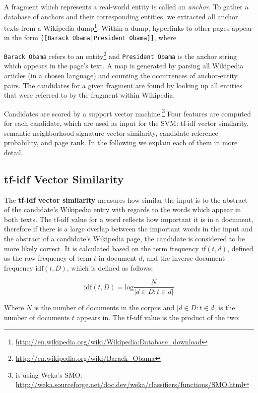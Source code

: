 \documentclass[runningheads,a4paper]{llncs}
\begin{document}
A fragment which represents a real-world entity is called an \textit{anchor}. To gather a database of anchors and their corresponding entities, we extracted all anchor texts from a Wikipedia dump\footnote{\url{http://en.wikipedia.org/wiki/Wikipedia:Database_download}}. Within a dump, hyperlinks to other pages appear in the form \texttt{[[Barack Obama|President Obama]]}, 
where {\texttt{Barack Obama} refers to an entity\footnote{\url{http://en.wikipedia.org/wiki/Barack_Obama}} and \texttt{President Obama} is the anchor string which appears in the page's text. A map is generated by parsing all Wikipedia articles (in a chosen language) and counting the occurrences of anchor-entity pairs. The candidates for a given fragment are found by looking up all entities that were referred to by the fragment within Wikipedia. 

Candidates are scored by a support vector machine.\footnote{{\acronym} is using Weka's SMO: \url{http://weka.sourceforge.net/doc.dev/weka/classifiers/functions/SMO.html}} Four features are computed for each candidate, which are used as input for the SVM: tf-idf vector similarity, semantic neighborhood signature vector similarity, candidate reference probability, and page rank. In the following we explain each of them in more detail.

\subsection{tf-idf Vector Similarity}

The \textbf{tf-idf vector similarity} measures how similar the input is to the abstract of the candidate's Wikipedia entry with regards to the words which appear in both texts. The tf-idf value for a word reflects how important it is in a document, therefore if there is a large overlap between the important words in the input and the abstract of a candidate's Wikipedia page, the candidate is considered to be more likely correct. It is calculated based on the term frequency $\mathrm{tf}(t,d)$, defined as the raw frequency of term $t$ in document $d$, and the inverse document frequency $\mathrm{idf}(t,D)$, which is defined as follows:

$$\mathrm{idf}(t, D) = \mathrm{log}\frac{N}{|{d \in D : t \in d}|}$$

Where $N$ is the number of documents in the corpus and $|{d \in D : t \in d}|$ is the number of documents $t$ appears in. The tf-idf value is the product of the two:

}
\end{document}
